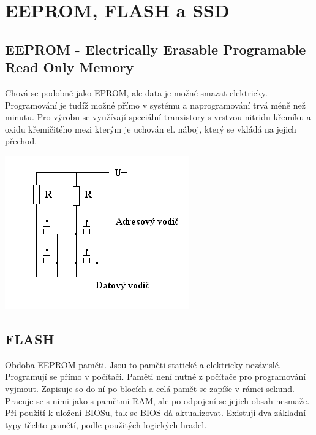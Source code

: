 \section{EEPROM, FLASH a SSD}
\subsection{EEPROM - Electrically Erasable Programable Read Only Memory}
\begin{multicols}{2}
    Chová se podobně jako EPROM, ale data je možné smazat elektricky.
    Programování je tudíž možné přímo v systému a naprogramování trvá méně než minutu.
    Pro výrobu se využívají speciální tranzistory s vrstvou nitridu křemíku a oxidu křemičitého mezi kterým je uchován el. náboj, který se vkládá na jejich přechod.\\
    \columnbreak

    \includegraphics[width=1\linewidth]{EEPROM.png}
\end{multicols}
\subsection{FLASH}
Obdoba EEPROM paměti.
Jsou to paměti statické a elektricky nezávislé.
Programují se přímo v počítači.
Paměti není nutné z počítače pro programování vyjmout.
Zapisuje so do ní po blocích a celá pamět se zapíše v rámci sekund.
Pracuje se s nimi jako s pamětmi RAM, ale po odpojení se jejich obsah nesmaže.
Při použití k uložení BIOSu, tak se BIOS dá aktualizovat.
Existují dva základní typy těchto pamětí, podle použitých logických hradel.
